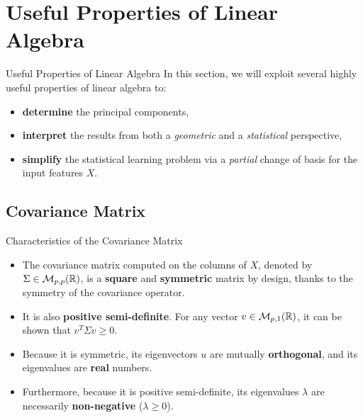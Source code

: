 \section[Useful Properties of Linear Algebra]{Useful Properties of Linear Algebra}

\begin{frame}{Useful Properties of Linear Algebra}
	In this section, we will exploit several highly useful properties of linear algebra to:
	\begin{itemize}
		\item \textbf{determine} the principal components, 
		\item \textbf{interpret} the results from both a \textit{geometric} and a \textit{statistical} perspective,
		\item \textbf{simplify} the statistical learning problem via a \textit{partial} change of basis for the input features $X$.
	\end{itemize}
\end{frame}

\subsection[Covariance Matrix]{Covariance Matrix}

\begin{frame}{Characteristics of the Covariance Matrix}
	\begin{itemize}
		\item The covariance matrix computed on the columns of $X$, denoted by $\Sigma \in \mathcal{M}_{p,p}(\mathbb{R})$, is a \textbf{square} and \textbf{symmetric} matrix by design, thanks to the symmetry of the covariance operator.
		\pause
		\item It is also \textbf{positive semi-definite}. For any vector $v \in \mathcal{M}_{p,1}(\mathbb{R})$, it can be shown that $v^T \Sigma v \ge 0$.
		\pause
		\item Because it is symmetric, its eigenvectors $u$ are mutually \textbf{orthogonal}, and its eigenvalues are \textbf{real} numbers.
		\pause
		\item Furthermore, because it is positive semi-definite, its eigenvalues $\lambda$ are necessarily \textbf{non-negative} ($\lambda \ge 0$).
	\end{itemize}
\end{frame}

